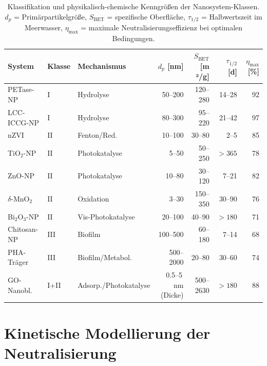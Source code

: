 ﻿\documentclass[12pt,a4paper]{article}
\theoremstyle{definition}
\theoremstyle{remark}
\begin{document}
\begin{table}
\centering
\caption{Klassifikation und physikalisch-chemische Kenngrößen der Nanosystem-Klassen.
  $d_p$ = Primärpartikelgröße, $S_{\text{BET}}$ = spezifische Oberfläche,
  $\tau_{1/2}$ = Halbwertszeit im Meerwasser, $\eta_{\text{max}}$ = maximale
  Neutralisierungseffizienz bei optimalen Bedingungen.}
\label{tab:klassifikation}
\begin{tabular}{lllrrrr}
\toprule
\textbf{System} & \textbf{Klasse} & \textbf{Mechanismus} & $d_p$ [nm] & $S_{\text{BET}}$ [m ²/g] & $\tau_{1/2}$ [d] & $\eta_{\text{max}}$ [\%] \\
\midrule
PETase-NP & I  & Hydrolyse     & 50--200    & 120--280 & 14--28  & 92 \\
LCC-ICCG-NP & I & Hydrolyse   & 80--300    & 95--220  & 21--42  & 97 \\
nZVI       & II & Fenton/Red.  & 10--100    & 30--80   & 2--5    & 85 \\
TiO$_2$-NP & II & Photokatalyse & 5--50    & 50--250  & $>365$  & 78 \\
ZnO-NP     & II & Photokatalyse & 10--80   & 30--120  & 7--21   & 82 \\
$\delta$-MnO$_2$ & II & Oxidation & 3--30  & 150--350 & 30--90  & 76 \\
Bi$_2$O$_3$-NP & II & Vis-Photokatalyse & 20--100 & 40--90 & $>180$ & 71 \\
Chitosan-NP & III & Biofilm     & 100--500   & 60--180  & 7--14   & 68 \\
PHA-Träger & III & Biofilm/Metabol. & 500--2000 & 20--80 & 30--60 & 74 \\
GO-Nanobl. & I+II & Adsorp./Photokatalyse & 0.5--5\,nm (Dicke) & 500--2630 & $>180$ & 88 \\
\bottomrule
\end{tabular}
\end{table}

\section{Kinetische Modellierung der Neutralisierung}
\label{sec:kinetik}
\end{document}
